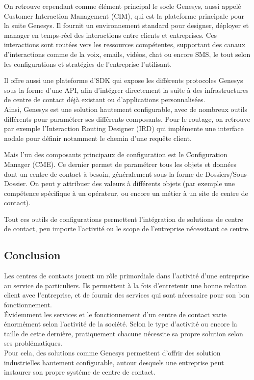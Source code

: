 \documentclass{rapport}
\begin{document}
On retrouve cependant comme élément principal le socle Genesys, aussi appelé Customer Interaction Management (CIM), qui est la plateforme principale pour la suite Genesys. Il fournit un environnement standard pour designer, déployer et manager en temps-réel des interactions entre clients et entreprises.
Ces interactions sont routées vers les ressources compétentes, supportant des canaux d'interactions comme de la voix, emails, vidéos, chat ou encore SMS, le tout selon les configurations et stratégies de l'entreprise l'utilisant.

Il offre aussi une plateforme d'SDK qui expose les différents protocoles Genesys sous la forme d'une API, afin d'intégrer directement la suite à des infrastructures de centre de contact déjà existant ou d'applications personnalisées.\\

Ainsi, Genesys est une solution hautement configurable, avec de nombreux outils différents pour paramétrer ses différents composants. Pour le routage, on retrouve par exemple l'Interaction Routing Designer (IRD) qui implémente une interface nodale pour définir notamment le chemin d'une requête client.

Mais l'un des composants principaux de configuration est le Configuration Manager (CME). Ce dernier permet de paramétrer tous les objets et données dont un centre de contact à besoin, généralement sous la forme de Dossiers/Sous-Dossier. On peut y attribuer des valeurs à différents objets (par exemple une compétence spécifique à un opérateur, ou encore un métier à un site de centre de contact).


Tout ces outils de configurations permettent l'intégration de solutions de centre de contact, peu importe l'activité ou le scope de l'entreprise nécessitant ce centre.

\subsection*{Conclusion}

Les centres de contacts jouent un rôle primordiale dans l'activité d'une entreprise au service de particuliers. Ils permettent à la fois d'entretenir une bonne relation client avec l'entreprise, et de fournir des services qui sont nécessaire pour son bon fonctionnement.\\
Évidemment les services et le fonctionnement d'un centre de contact varie énormément selon l'activité de la société. Selon le type d'activité ou encore la taille de cette dernière, pratiquement chacune nécessite sa propre solution selon ses problématiques.\\
Pour cela, des solutions comme Genesys permettent d'offrir des solution industrielles hautement configurable, autour desquels une entreprise peut instaurer son propre systéme de centre de contact.
\end{document}
